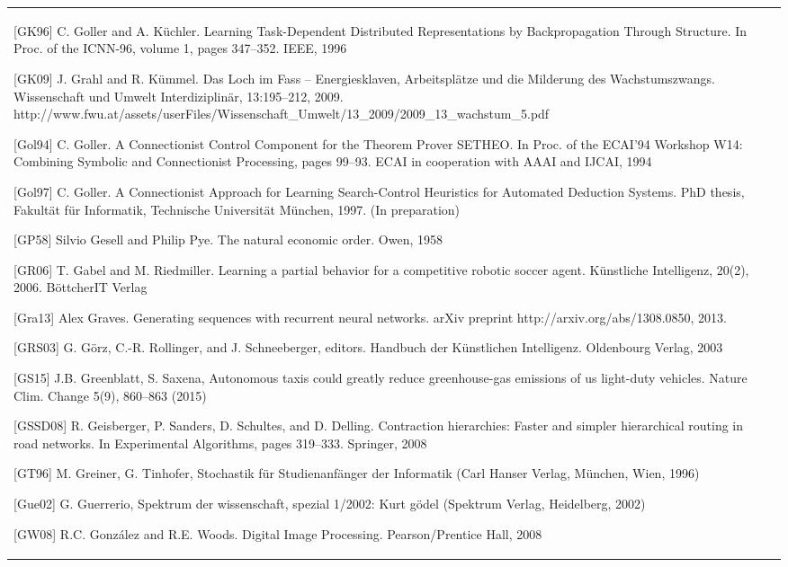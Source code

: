 \documentclass[10pt]{book}
\begin{document}
\begin{center}
\begin{tabular}{|l|l|}
[GK96] C. Goller and A. Küchler. Learning Task-Dependent Distributed Representations by Backpropagation Through Structure. In Proc. of the ICNN-96, volume 1, pages 347–352. IEEE, 1996

[GK09] J. Grahl and R. Kümmel. Das Loch im Fass – Energiesklaven, Arbeitsplätze und die Milderung des Wachstumszwangs. Wissenschaft und Umwelt Interdiziplinär, 13:195–212, 2009. http://www.fwu.at/assets/userFiles/Wissenschaft\_Umwelt/13\_2009/2009\_13\_wachstum\_5.pdf

[Gol94] C. Goller. A Connectionist Control Component for the Theorem Prover SETHEO. In Proc. of the ECAI'94 Workshop W14: Combining Symbolic and Connectionist Processing, pages 99–93. ECAI in cooperation with AAAI and IJCAI, 1994

[Gol97] C. Goller. A Connectionist Approach for Learning Search-Control Heuristics for Automated Deduction Systems. PhD thesis, Fakultät für Informatik, Technische Universität München, 1997. (In preparation)

[GP58] Silvio Gesell and Philip Pye. The natural economic order. Owen, 1958

[GR06] T. Gabel and M. Riedmiller. Learning a partial behavior for a competitive robotic soccer agent. Künstliche Intelligenz, 20(2), 2006. BöttcherIT Verlag

[Gra13] Alex Graves. Generating sequences with recurrent neural networks. arXiv preprint http://arxiv.org/abs/1308.0850, 2013.

[GRS03] G. Görz, C.-R. Rollinger, and J. Schneeberger, editors. Handbuch der Künstlichen Intelligenz. Oldenbourg Verlag, 2003

[GS15] J.B. Greenblatt, S. Saxena, Autonomous taxis could greatly reduce greenhouse-gas emissions of us light-duty vehicles. Nature Clim. Change 5(9), 860–863 (2015)

[GSSD08] R. Geisberger, P. Sanders, D. Schultes, and D. Delling. Contraction hierarchies: Faster and simpler hierarchical routing in road networks. In Experimental Algorithms, pages 319–333. Springer, 2008

[GT96] M. Greiner, G. Tinhofer, Stochastik für Studienanfänger der Informatik (Carl Hanser Verlag, München, Wien, 1996)

[Gue02] G. Guerrerio, Spektrum der wissenschaft, spezial 1/2002: Kurt gödel (Spektrum Verlag, Heidelberg, 2002)

[GW08] R.C. González and R.E. Woods. Digital Image Processing. Pearson/Prentice Hall, 2008


\end{tabular}
\end{center}
\end{document}
